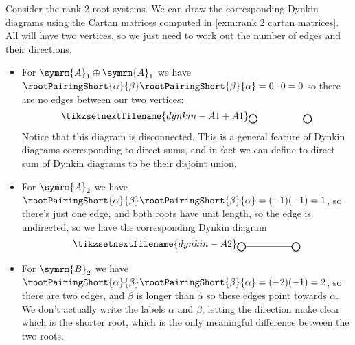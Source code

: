 \documentclass[fleqn]{NotesClass}
\newcommand{\dynkin}[2]{\symrm{#1}_{#2}}
\begin{document}
    \begin{exm}{}{}
        Consider the rank 2 root systems.
        We can draw the corresponding Dynkin diagrams using the Cartan matrices computed in \cref{exm:rank 2 cartan matrices}.
        All will have two vertices, so we just need to work out the number of edges and their directions.
        \begin{itemize}
            \item For \(\dynkin{A}{1} \oplus \dynkin{A}{1}\) we have \(\rootPairingShort{\alpha}{\beta} \rootPairingShort{\beta}{\alpha} = 0 \cdot 0 = 0\) so there are no edges between our two vertices:
            \begin{equation}
                \tikzsetnextfilename{dynkin-A1+A1}
                \begin{tikzpicture}[baseline=(current bounding box)]
                    \draw[thick, fill=white] (0, 0) circle [radius=0.15];
                    \draw[thick, fill=white] (2, 0) circle [radius=0.15];
                \end{tikzpicture}
            \end{equation}
            Notice that this diagram is disconnected.
            This is a general feature of Dynkin diagrams corresponding to direct sums, and in fact we can define to direct sum of Dynkin diagrams to be their disjoint union.
            \item For \(\dynkin{A}{2}\) we have \(\rootPairingShort{\alpha}{\beta} \rootPairingShort{\beta}{\alpha} = (-1)(-1) = 1\), so there's just one edge, and both roots have unit length, so the edge is undirected, so we have the corresponding Dynkin diagram
            \begin{equation}
                \tikzsetnextfilename{dynkin-A2}
                \begin{tikzpicture}[baseline=(current bounding box)]
                    \draw[thick] (0, 0) -- (2, 0);
                    \draw[thick, fill=white] (0, 0) circle [radius=0.15];
                    \draw[thick, fill=white] (2, 0) circle [radius=0.15];
                \end{tikzpicture}
            \end{equation}
            \item For \(\dynkin{B}{2}\) we have \(\rootPairingShort{\alpha}{\beta} \rootPairingShort{\beta}{\alpha} = (-2)(-1) = 2\), so there are two edges, and \(\beta\) is longer than \(\alpha\) so these edges point towards \(\alpha\).
            We don't actually write the labels \(\alpha\) and \(\beta\), letting the direction make clear which is the shorter root, which is the only meaningful difference between the two roots.

\end{itemize}
\end{exm}
\end{document}
